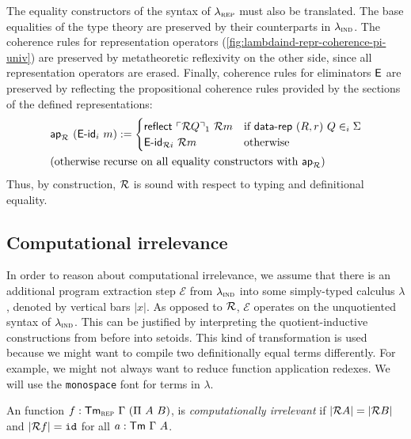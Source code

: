 The equality constructors of the syntax of $\lambda_{\textsc{rep}}$ must also be translated.
The base equalities of the type theory are preserved by their counterparts in $\lambda_{\textsc{ind}}$.
The coherence rules for representation operators
(\cref{fig:lambdaind-repr-coherence-pi-univ}) are preserved by metatheoretic
reflexivity on the other side, since all representation operators are erased.
Finally, coherence rules for eliminators $\textsf{E}$ are preserved by reflecting
the propositional coherence rules provided by the sections of the defined
representations:
\begin{align*}
& \mta{ap}_\R\ (\mta{E-id}_i\ m) :=
\begin{cases}
    \mta{reflect}\ \emb{\R Q}_1\ \R m & \text{if}\ \mta{data-rep}\ (R, r)\ Q \in_i \Sigma \\
    \mta{E-id}_{\R i}\ \R m & \text{otherwise}
    \end{cases} \\
& \text{(otherwise recurse on all equality constructors with $\mta{ap}_\R$)}
\end{align*}
Thus, by construction, $\mathcal{R}$ is sound with respect to typing and definitional equality.

\subsection{Computational irrelevance}

In order to reason about computational irrelevance, we assume that there is
an additional program extraction step $\mathcal{E}$ from $\lambda_{\textsc{ind}}$ into some
simply-typed calculus $\lambda$, denoted by vertical bars $|x|$. As opposed to
$\mathcal{R}$, $\mathcal{E}$ operates on the unquotiented syntax of $\lambda_{\textsc{ind}}$. This
can be justified by interpreting the quotient-inductive constructions from
before into setoids. This kind of
transformation is used because we might want to compile two definitionally equal
terms differently. For example, we might not always want to reduce function
application redexes. We will use the \texttt{monospace} font for terms in
$\lambda$.

\begin{definition}
    An function $f : \mta{Tm}_\rep\ \Gamma\ (\Pi\ A\ B)$, is \emph{computationally irrelevant} if
    $|\mathcal{R} A| = |\mathcal{R} B|$ and $|\mathcal{R} f| = \texttt{id}$ for all $a : \textsf{Tm}\ \Gamma\ A$.
\end{definition}

